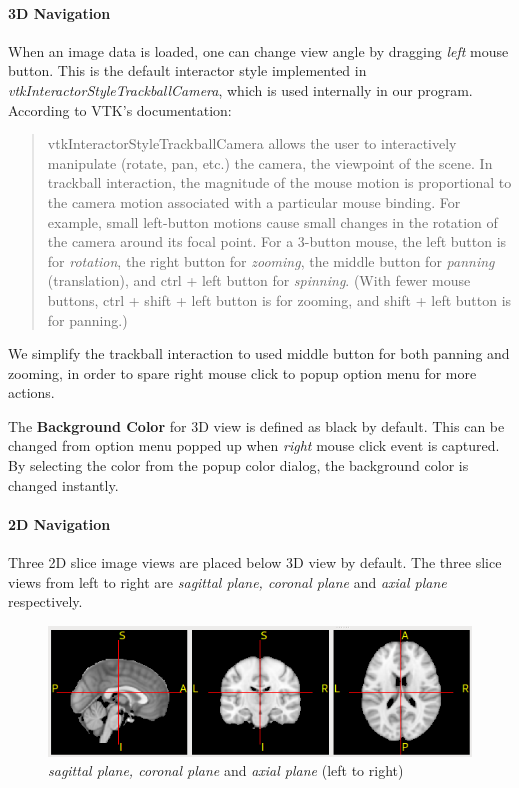 \documentclass[letterpaper,10pt,english]{sphinxmanual}
\begin{document}
\paragraph{3D Navigation}
\label{visualization:d-navigation}
When an image data is loaded, one can change view angle by dragging \emph{left} mouse button.
This is the default interactor style implemented in \emph{vtkInteractorStyleTrackballCamera},
which is used internally in our program. According to VTK's documentation:
\begin{quote}

vtkInteractorStyleTrackballCamera allows the user to interactively manipulate
(rotate, pan, etc.) the camera, the viewpoint of the scene.
In trackball interaction, the magnitude of the mouse motion is proportional
to the camera motion associated with a particular mouse binding.
For example, small left-button motions cause small changes in the rotation of
the camera around its focal point. For a 3-button mouse, the left button
is for \emph{rotation}, the right button for \emph{zooming},
the middle button for \emph{panning} (translation),
and ctrl + left button for \emph{spinning}. (With fewer mouse buttons,
ctrl + shift + left button is for zooming, and shift + left button is for panning.)
\end{quote}

We simplify the trackball interaction to used middle button for both panning and zooming,
in order to spare right mouse click to popup option menu for more actions.

The \textbf{Background Color} for 3D view is defined as black by default.
This can be changed from option menu popped up when \emph{right} mouse click event is captured.
By selecting the color from the popup color dialog, the background color is changed instantly.


\paragraph{2D Navigation}
\label{visualization:id1}
Three 2D slice image views are placed below 3D view by default.
The three slice views from left to right are \emph{sagittal plane, coronal plane} and
\emph{axial plane} respectively.
\begin{figure}[htbp]
\centering
\capstart

\includegraphics{view_slice2d.png}
\caption{\emph{sagittal plane, coronal plane} and \emph{axial plane} (left to right)}\end{figure}
\end{document}
